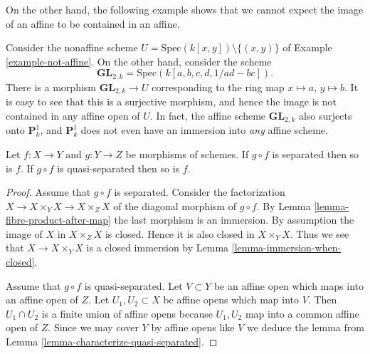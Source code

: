 \noindent
On the other hand, the following example shows that we cannot
expect the image of an affine to be contained in an affine.

\begin{example}
\label{example-image-affine-projective}
Consider the nonaffine scheme
$U = \text{Spec}(k[x, y]) \setminus \{(x, y)\}$ of
Example \ref{example-not-affine}. On the other hand, consider the
scheme
$$
\mathbf{GL}_{2, k} = \text{Spec}(k[a,b,c,d, 1/ad - bc]).
$$
There is a morphism $\mathbf{GL}_{2, k} \to U$ corresponding
to the ring map $x \mapsto a$, $y \mapsto b$. It is easy to see that
this is a surjective morphism, and hence the image is not contained
in any affine open of $U$. In fact, the affine scheme
$\mathbf{GL}_{2, k}$ also surjects onto $\mathbf{P}^1_k$, and
$\mathbf{P}^1_k$ does not even have an immersion into {\it any} affine scheme.
\end{example}

\begin{lemma}
\label{lemma-compose-after-separated}
Let $f : X \to Y$ and $g : Y \to Z$ be morphisms of schemes.
If $g \circ f$ is separated then so is $f$.
If $g \circ f$ is quasi-separated then so is $f$.
\end{lemma}

\begin{proof}
Assume that $g \circ f$ is separated.
Consider the factorization $X \to X \times_Y X \to X \times_Z X$
of the diagonal morphism of $g \circ f$.
By Lemma \ref{lemma-fibre-product-after-map}
the last morphism is an immersion. By assumption the image
of $X$ in $X \times_Z X$ is closed. Hence it is also closed
in $X \times_Y X$. Thus we see that $X \to X \times_Y X$
is a closed immersion by Lemma \ref{lemma-immersion-when-closed}.

\medskip\noindent
Assume that $g \circ f$ is quasi-separated.
Let $V \subset Y$ be an affine open which maps into an affine
open of $Z$. Let $U_1, U_2 \subset X$ be affine opens which
map into $V$. Then $U_1 \cap U_2$ is a finite union of affine
opens because $U_1, U_2$ map into a common affine open
of $Z$. Since we may cover $Y$ by affine opens like $V$ we
deduce the lemma from Lemma \ref{lemma-characterize-quasi-separated}.
\end{proof}











